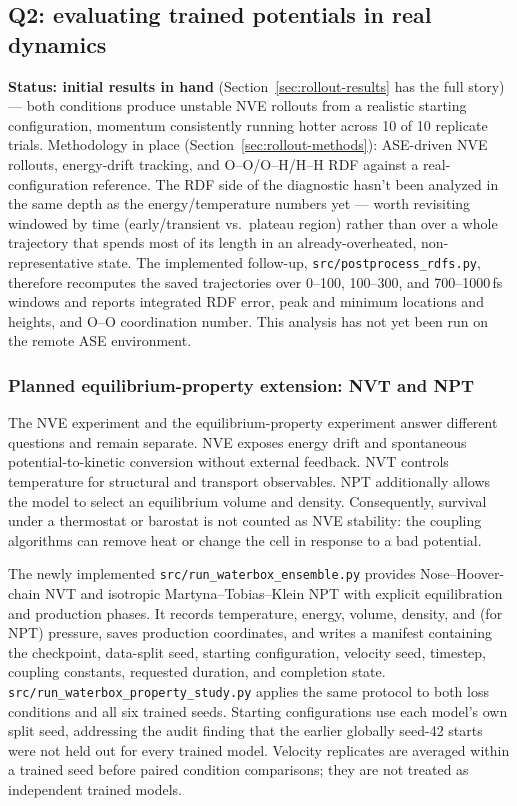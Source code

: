 \documentclass[11pt]{article}
\begin{document}
\subsection{Q2: evaluating trained potentials in real dynamics}
\label{sec:q2}

\textbf{Status: initial results in hand} (Section~\ref{sec:rollout-results}
has the full story) --- both conditions produce unstable NVE rollouts from a
realistic starting configuration, momentum consistently running hotter
across 10 of 10 replicate trials. Methodology in place
(Section~\ref{sec:rollout-methods}): ASE-driven NVE rollouts, energy-drift
tracking, and O--O/O--H/H--H RDF against a real-configuration reference.
The RDF side of the diagnostic hasn't been analyzed in the same depth as the
energy/temperature numbers yet --- worth revisiting windowed by time
(early/transient vs.\ plateau region) rather than over a whole trajectory
that spends most of its length in an already-overheated, non-representative
state. The implemented follow-up, \texttt{src/postprocess\_rdfs.py}, therefore
recomputes the saved trajectories over 0--100, 100--300, and 700--1000\,fs
windows and reports integrated RDF error, peak and minimum locations and
heights, and O--O coordination number. This analysis has not yet been run on
the remote ASE environment.

\subsubsection{Planned equilibrium-property extension: NVT and NPT}
\label{sec:waterbox-property-extension}

The NVE experiment and the equilibrium-property experiment answer different
questions and remain separate. NVE exposes energy drift and spontaneous
potential-to-kinetic conversion without external feedback. NVT controls
temperature for structural and transport observables. NPT additionally
allows the model to select an equilibrium volume and density. Consequently,
survival under a thermostat or barostat is not counted as NVE stability: the
coupling algorithms can remove heat or change the cell in response to a bad
potential.

The newly implemented \texttt{src/run\_waterbox\_ensemble.py} provides
Nose--Hoover-chain NVT and isotropic Martyna--Tobias--Klein NPT with explicit
equilibration and production phases. It records temperature, energy, volume,
density, and (for NPT) pressure, saves production coordinates, and writes a
manifest containing the checkpoint, data-split seed, starting configuration,
velocity seed, timestep, coupling constants, requested duration, and
completion state. \texttt{src/run\_waterbox\_property\_study.py} applies the
same protocol to both loss conditions and all six trained seeds. Starting
configurations use each model's own split seed, addressing the audit finding
that the earlier globally seed-42 starts were not held out for every trained
model. Velocity replicates are averaged within a trained seed before paired
condition comparisons; they are not treated as independent trained models.
\end{document}
